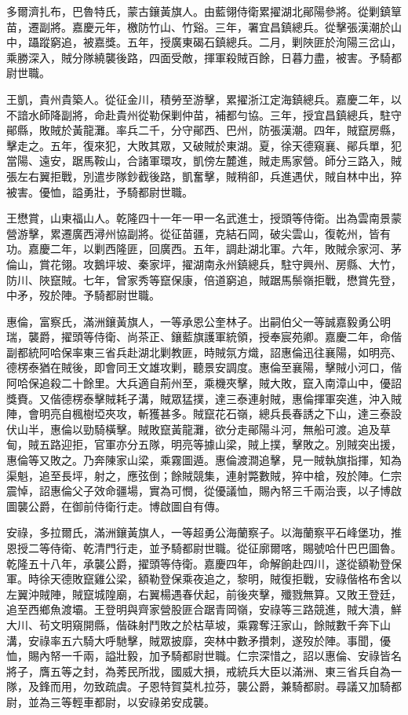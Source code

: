 \begin{pinyinscope}
多爾濟扎布，巴魯特氏，蒙古鑲黃旗人。由藍翎侍衛累擢湖北鄖陽參將。從剿鎮筸苗，遷副將。嘉慶元年，檄防竹山、竹谿。三年，署宜昌鎮總兵。從擊張漢潮於山中，躡蹤窮追，被嘉獎。五年，授廣東碣石鎮總兵。二月，剿陜匪於洵陽三岔山，乘勝深入，賊分隊繞襲後路，四面受敵，揮軍殺賊百餘，日暮力盡，被害。予騎都尉世職。

王凱，貴州貴築人。從征金川，積勞至游擊，累擢浙江定海鎮總兵。嘉慶二年，以不諳水師降副將，命赴貴州從勒保剿仲苗，補都勻協。三年，授宜昌鎮總兵，駐守鄖縣，敗賊於黃龍灘。率兵二千，分守鄖西、巴州，防張漢潮。四年，賊竄房縣，擊走之。五年，復來犯，大敗其眾，又破賊於東湖。夏，徐天德窺襄、鄖兵單，犯當陽、遠安，踞馬鞍山，合諸軍環攻，凱傍左麓進，賊走馬家營。師分三路入，賊張左右翼拒戰，別遣步隊鈔截後路，凱奮擊，賊稍卻，兵進遇伏，賊自林中出，猝被害。優恤，謚勇壯，予騎都尉世職。

王懋賞，山東福山人。乾隆四十一年一甲一名武進士，授頭等侍衛。出為雲南景蒙營游擊，累遷廣西潯州協副將。從征苗疆，克結石岡，破尖雲山，復乾州，皆有功。嘉慶二年，以剿西隆匪，回廣西。五年，調赴湖北軍。六年，敗賊佘家河、茅倫山，賞花翎。攻鵝坪坡、秦家坪，擢湖南永州鎮總兵，駐守興州、房縣、大竹，防川、陜竄賊。七年，曾家秀等竄保康，倍道窮追，賊踞馬鬃嶺拒戰，懋賞先登，中矛，歿於陣。予騎都尉世職。

惠倫，富察氏，滿洲鑲黃旗人，一等承恩公奎林子。出嗣伯父一等誠嘉毅勇公明瑞，襲爵，擢頭等侍衛、尚茶正、鑲藍旗護軍統領，授奉宸苑卿。嘉慶二年，命偕副都統阿哈保率東三省兵赴湖北剿教匪，時賊氛方熾，詔惠倫迅往襄陽，如明亮、德楞泰猶在賊後，即會同王文雄攻剿，聽景安調度。惠倫至襄陽，擊賊小河口，偕阿哈保追殺二十餘里。大兵適自荊州至，乘機夾擊，賊大敗，竄入南漳山中，優詔獎賚。又偕德楞泰擊賊耗子溝，賊眾猛撲，達三泰連射賊，惠倫揮軍突進，沖入賊陣，會明亮自楓樹埡夾攻，斬獲甚多。賊竄花石嶺，總兵長春誘之下山，達三泰設伏山半，惠倫以勁騎橫擊。賊敗竄黃龍灘，欲分走鄖陽斗河，無船可渡。追及草甸，賊五路迎拒，官軍亦分五隊，明亮等據山梁，賊上撲，擊敗之。別賊突出援，惠倫等又敗之。乃奔陳家山梁，乘霧圖遁。惠倫渡澗追擊，見一賊執旗指揮，知為渠魁，追至長坪，射之，應弦倒；餘賊競集，連射斃數賊，猝中槍，歿於陣。仁宗震悼，詔惠倫父子效命疆場，實為可憫，從優議恤，賜內帑三千兩治喪，以子博啟圖襲公爵，在御前侍衛行走。博啟圖自有傳。

安祿，多拉爾氏，滿洲鑲黃旗人，一等超勇公海蘭察子。以海蘭察平石峰堡功，推恩授二等侍衛、乾清門行走，並予騎都尉世職。從征廓爾喀，賜號哈什巴巴圖魯。乾隆五十八年，承襲公爵，擢頭等侍衛。嘉慶四年，命解餉赴四川，遂從額勒登保軍。時徐天德敗竄雞公梁，額勒登保乘夜追之，黎明，賊復拒戰，安祿偕格布舍以左翼沖賊陣，賊竄城隍廟，右翼楊遇春伏起，前後夾擊，殲戮無算。又敗王登廷，追至西鄉魚渡壩。王登明與齊家營股匪合踞青岡嶺，安祿等三路競進，賊大潰，鮮大川、茍文明窺開縣，偕硃射鬥敗之於枯草坡，乘霧奪汪家山，餘賊數千奔下山溝，安祿率五六騎大呼馳擊，賊眾披靡，突林中數矛攢刺，遂歿於陣。事聞，優恤，賜內帑一千兩，謚壯毅，加予騎都尉世職。仁宗深惜之，詔以惠倫、安祿皆名將子，膺五等之封，為莠民所戕，國威大損，戒統兵大臣以滿洲、東三省兵自為一隊，及鋒而用，勿致疏虞。子恩特賀莫札拉芬，襲公爵，兼騎都尉。尋議又加騎都尉，並為三等輕車都尉，以安祿弟安成襲。


\end{pinyinscope}

